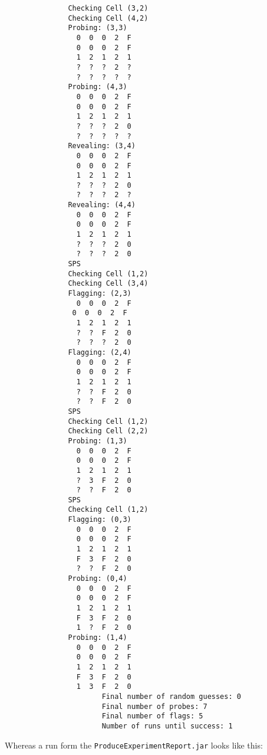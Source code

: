 \documentclass[british]{article}
\newcommand{\code}[1]{\texttt{#1}}
\begin{document}
\begin{lstlisting}
               Checking Cell (3,2)
               Checking Cell (4,2)
               Probing: (3,3)
                 0  0  0  2  F
                 0  0  0  2  F
                 1  2  1  2  1
                 ?  ?  ?  2  ?
                 ?  ?  ?  ?  ?
               Probing: (4,3)
                 0  0  0  2  F
                 0  0  0  2  F
                 1  2  1  2  1
                 ?  ?  ?  2  0
                 ?  ?  ?  ?  ?
               Revealing: (3,4)
                 0  0  0  2  F
                 0  0  0  2  F
                 1  2  1  2  1
                 ?  ?  ?  2  0
                 ?  ?  ?  2  ?
               Revealing: (4,4)
                 0  0  0  2  F
                 0  0  0  2  F
                 1  2  1  2  1
                 ?  ?  ?  2  0
                 ?  ?  ?  2  0
               SPS
               Checking Cell (1,2)
               Checking Cell (3,4)
               Flagging: (2,3)
                 0  0  0  2  F
                0  0  0  2  F
                 1  2  1  2  1
                 ?  ?  F  2  0
                 ?  ?  ?  2  0
               Flagging: (2,4)
                 0  0  0  2  F
                 0  0  0  2  F
                 1  2  1  2  1
                 ?  ?  F  2  0
                 ?  ?  F  2  0
               SPS
               Checking Cell (1,2)
               Checking Cell (2,2)
               Probing: (1,3)
                 0  0  0  2  F
                 0  0  0  2  F
                 1  2  1  2  1
                 ?  3  F  2  0
                 ?  ?  F  2  0
               SPS
               Checking Cell (1,2)
               Flagging: (0,3)
                 0  0  0  2  F
                 0  0  0  2  F
                 1  2  1  2  1
                 F  3  F  2  0
                 ?  ?  F  2  0
               Probing: (0,4)
                 0  0  0  2  F
                 0  0  0  2  F
                 1  2  1  2  1
                 F  3  F  2  0
                 1  ?  F  2  0
               Probing: (1,4)
                 0  0  0  2  F
                 0  0  0  2  F
                 1  2  1  2  1
                 F  3  F  2  0
                 1  3  F  2  0
                       Final number of random guesses: 0
                       Final number of probes: 7
                       Final number of flags: 5
                       Number of runs until success: 1
\end{lstlisting}
Whereas a run form the \code{ProduceExperimentReport.jar} looks like this:
\end{document}
